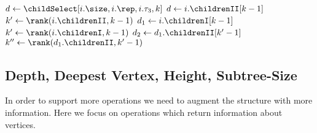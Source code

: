 \begin{algorithm}
\begin{algorithmic}
		\State $d \gets \childSelect[i.\size, i.\rep, i.\tau_3, k]$
		\State {}
		\State $d \gets i.\childrenII[k - 1]$
		\State $k' \gets \rank(i.\childrenII, k - 1)$
		 
			\State {}
		\Else {}
			\State {}
		\EndIf
	\Else
		\State $d_1 \gets i.\childrenI[k - 1]$
		\State $k' \gets \rank(i.\childrenI, k - 1)$
		 
			\State $d_2 \gets d_1.\childrenII[k' - 1]$
			\State $k'' \gets \rank(d_1.\childrenII, k' - 1)$
			 
				\State {}
			\Else {}
				\State {}
			\EndIf
		\Else {}
			\State {}
		\EndIf
	\EndIf
\EndFunction
\end{algorithmic}
\end{algorithm}

\subsection{Depth, Deepest Vertex, Height, Subtree-Size}

In order to support more operations we need to augment the structure with more information.
Here we focus on operations which return information about vertices.

